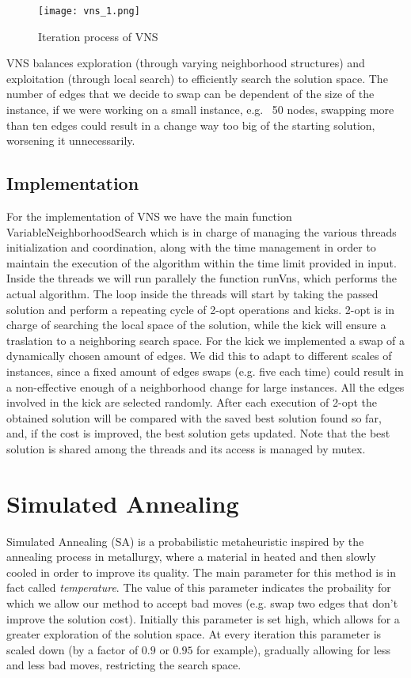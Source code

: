 \begin{figure}
    \centering
    \texttt{[image: vns\_1.png]}
    \caption{Iteration process of VNS}
    \label{fig:vns}
\end{figure}

VNS balances exploration (through varying neighborhood structures) and exploitation (through local search) to efficiently search the solution space.
The number of edges that we decide to swap can be dependent of the size of the instance, if we were working on a small instance, e.g. 
~50 nodes, swapping more than ten edges could result in a change way too big of the starting solution, worsening it unnecessarily.

\subsection{Implementation}
For the implementation of VNS we have the main function VariableNeighborhoodSearch which is in charge of managing the various threads initialization 
and coordination, along with the time management in order to maintain the execution of the algorithm within the time limit provided in input.
Inside the threads we will run parallely the function runVns, which performs the actual algorithm.
The loop inside the threads will start by taking the passed solution and perform a repeating cycle of 2-opt operations and kicks. 2-opt is in charge 
of searching the local space of the solution, while the kick will ensure a traslation to a neighboring search space.
For the kick we implemented a swap of a dynamically chosen amount of edges. We did this to adapt to different scales of instances, since a fixed 
amount of edges swaps (e.g. five each time) could result in a non-effective enough of a neighborhood change for large instances. All the edges involved in the kick are selected randomly.
After each execution of 2-opt the obtained solution will be compared with the saved best solution found so far, and, if the cost is improved, the 
best solution gets updated. Note that the best solution is shared among the threads and its access is managed by mutex.

\section{Simulated Annealing}
Simulated Annealing (SA) is a probabilistic metaheuristic inspired by the annealing process in metallurgy, where a material in heated
and then slowly cooled in order to improve its quality. The main parameter for this method is in fact called \textit{temperature}.
The value of this parameter indicates the probaility for which we allow our method to accept bad moves (e.g. swap two edges that 
don't improve the solution cost). Initially this parameter is set high, which allows for a greater exploration of the solution space.
At every iteration this parameter is scaled down (by a factor of $0.9$ or $0.95$ for example), gradually allowing for less and less 
bad moves, restricting the search space. 

